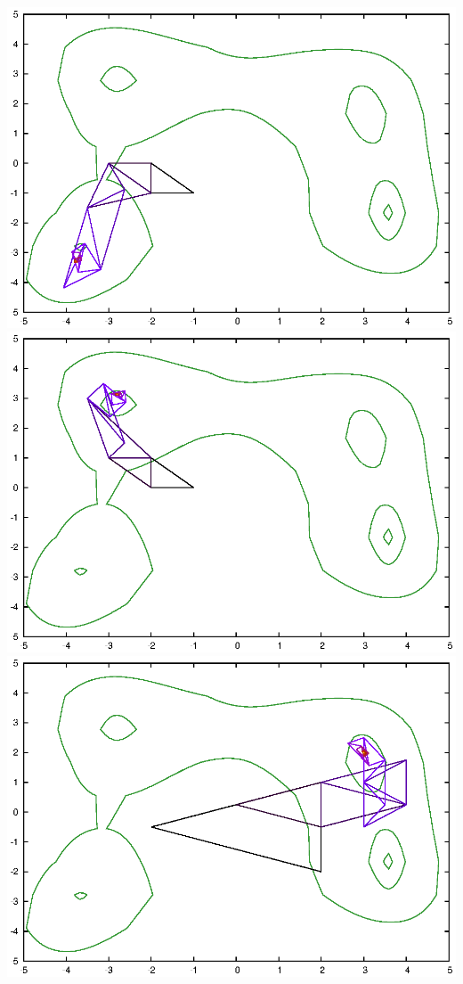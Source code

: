 \documentclass[12pt]{article}
\theoremstyle{plain}
\theoremstyle{remark}
\theoremstyle{definition}
\begin{document}
 \noindent
\includegraphics[scale=0.6]{himmelblau1.eps}
\includegraphics[scale=0.6]{himmelblau2.eps}
\includegraphics[scale=0.6]{himmelblau3.eps}
\end{document}
